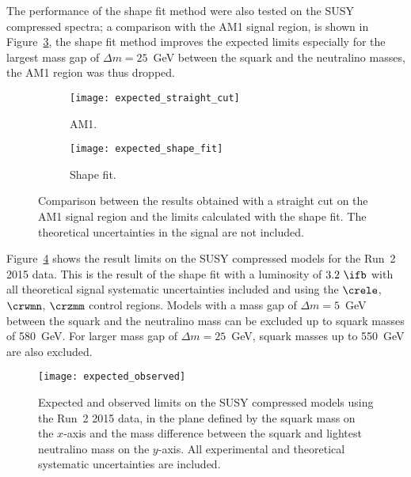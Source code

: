 The performance of the shape fit method were also tested on the SUSY compressed
spectra; a comparison with the AM1 signal region, is shown in
Figure~\ref{fig:shape_straight_comparison}, the shape fit method improves the
expected limits especially for the largest mass gap of $\Delta m = 25$~GeV
between the squark and the neutralino masses, the AM1 region was thus dropped.
\begin{figure}[!h]
  \centering
  \begin{subfigure}[t]{.48\linewidth}
    \texttt{[image: expected\_straight\_cut]}
    \caption{AM1.}
    \label{fig:expected_im1}
  \end{subfigure}
  \begin{subfigure}[t]{.48\linewidth}
    \texttt{[image: expected\_shape\_fit]}
    \caption{Shape fit.}
    \label{fig:expected_straight}
  \end{subfigure}
  \caption{Comparison between the results obtained with a straight cut on the
    AM1 signal region and the limits calculated with the shape fit. The
    theoretical uncertainties in the signal are not included.}
  \label{fig:shape_straight_comparison}
\end{figure}

Figure~\ref{fig:expected_observed} shows the result limits on the SUSY
compressed models for the Run~2 2015 data. This is the result of the shape fit
with a luminosity of $3.2~\ifb$ with all theoretical signal systematic
uncertainties included and using the $\crele$, $\crwmn$, $\crzmm$ control
regions. Models with a mass gap of $\Delta m = 5$~GeV between the squark and the
neutralino mass can be excluded up to squark masses of 580~GeV. For larger mass
gap of $\Delta m = 25$~GeV, squark masses up to 550~GeV are also excluded.
\begin{figure}[!h]
  \centering
    \texttt{[image: expected\_observed]}
    \caption{Expected and observed limits on the SUSY compressed models using
      the Run~2 2015 data, in the plane defined by the squark mass on the
      $x$-axis and the mass difference between the squark and lightest
      neutralino mass on the $y$-axis. All experimental and theoretical
      systematic uncertainties are included.}
\label{fig:results:susy:compressed_observed}
    \label{fig:expected_observed}
\end{figure}
